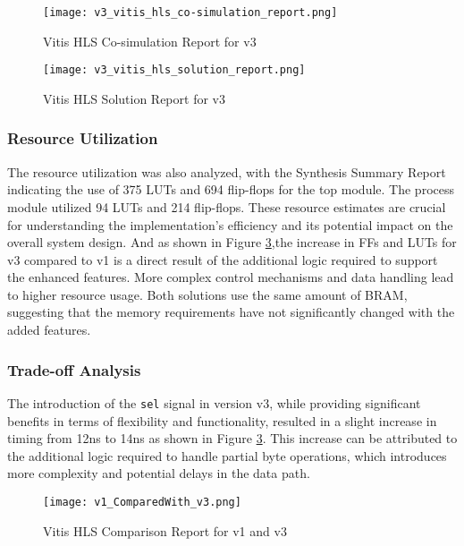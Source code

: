 \documentclass[conference]{IEEEtran}
\begin{document}
\begin{figure}[htbp]
    \centering
    \texttt{[image: v3\_vitis\_hls\_co-simulation\_report.png]}
    \caption{Vitis HLS Co-simulation Report for v3}
    \label{fig:v3_vitis_hls_co-simulation_report}
\end{figure}

\begin{figure}[h]
    \centering
    \texttt{[image: v3\_vitis\_hls\_solution\_report.png]}
    \caption{Vitis HLS Solution Report for v3}
    \label{fig:v3_vitis_hls_solution_report}
\end{figure}

\subsubsection{Resource Utilization}
The resource utilization was also analyzed, with the Synthesis Summary Report indicating the use of 375 LUTs and 694 flip-flops for the top module. The process module utilized 94 LUTs and 214 flip-flops. These resource estimates are crucial for understanding the implementation's efficiency and its potential impact on the overall system design. And as shown in Figure \ref{v1_ComparedWith_v3},the increase in FFs and LUTs for v3 compared to v1 is a direct result of the additional logic required to support the enhanced features. More complex control mechanisms and data handling lead to higher resource usage.
Both solutions use the same amount of BRAM, suggesting that the memory requirements have not significantly changed with the added features.


\subsubsection{Trade-off Analysis}
The introduction of the \texttt{sel} signal in version v3, while providing significant benefits in terms of flexibility and functionality, resulted in a slight increase in timing from 12ns to 14ns as shown in Figure \ref{v1_ComparedWith_v3}. This increase can be attributed to the additional logic required to handle partial byte operations, which introduces more complexity and potential delays in the data path.

\begin{figure}[h]
    \centering
    \texttt{[image: v1\_ComparedWith\_v3.png]}
    \caption{Vitis HLS Comparison Report for v1 and v3}
    \label{v1_ComparedWith_v3}
\end{figure}
\end{document}
